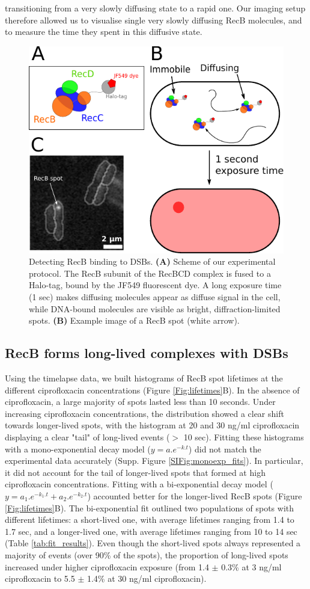 transitioning from a very slowly diffusing state to a rapid one. Our imaging setup therefore allowed us to visualise single very slowly diffusing RecB molecules, and to measure the time they spent in this diffusive state.

\begin{figure}[htbp]
    \centering
    \includegraphics[width=.45\textwidth]{Figures/Fig1_Exp_principle.pdf}
    \caption{Detecting RecB binding to DSBs. \textbf{(A)} Scheme of our experimental protocol. The RecB subunit of the RecBCD complex is fused to a Halo-tag, bound by the JF549 fluorescent dye\cite{Lepore2019a, Lepore2023}. A long exposure time (1 sec) makes diffusing molecules appear as diffuse signal in the cell, while DNA-bound molecules are visible as bright, diffraction-limited spots. \textbf{(B)} Example image of a RecB spot (white arrow).}
    \label{Fig:exp_principle}
\end{figure}

\subsection*{RecB forms long-lived complexes with DSBs}

Using the timelapse data, we built histograms of RecB spot lifetimes at the different ciprofloxacin concentrations (Figure \ref{Fig:lifetimes}B). In the absence of ciprofloxacin, a large majority of spots lasted less than 10 seconds. Under increasing ciprofloxacin concentrations, the distribution showed a clear shift towards longer-lived spots, with the histogram at 20 and 30 ng/ml ciprofloxacin displaying a clear "tail" of long-lived events ($>$ 10 sec). Fitting these histograms with a mono-exponential decay model ($y = a.e^{-k.t}$) did not match the experimental data accurately (Supp. Figure \ref{SIFig:monoexp_fits}). In particular, it did not account for the tail of longer-lived spots that formed at high ciprofloxacin concentrations. Fitting with a bi-exponential decay model ($y = a_1.e^{-k_1.t} + a_2.e^{-k_2.t}$) accounted better for the longer-lived RecB spots (Figure \ref{Fig:lifetimes}B). The bi-exponential fit outlined two populations of spots with different lifetimes: a short-lived one, with average lifetimes ranging from 1.4 to 1.7 sec, and a longer-lived one, with average lifetimes ranging from 10 to 14 sec (Table \ref{tab:fit_results}). Even though the short-lived spots always represented a majority of events (over 90\% of the spots), the proportion of long-lived spots increased under higher ciprofloxacin exposure (from 1.4 $\pm$ 0.3\% at 3 ng/ml ciprofloxacin to 5.5 $\pm$ 1.4\% at 30 ng/ml ciprofloxacin).

